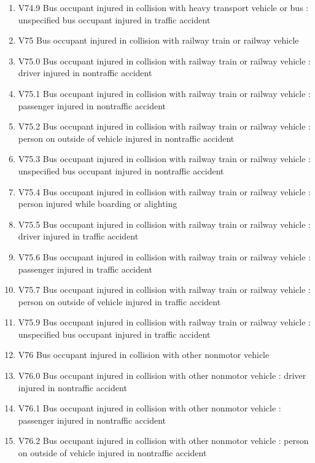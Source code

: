 \documentclass[
]{scrartcl}
\begin{document}
\begin{itemize}
\begin{enumerate}
  \item
    V74.9 Bus occupant injured in collision with heavy transport vehicle
    or bus : unspecified bus occupant injured in traffic accident
  \item
    V75 Bus occupant injured in collision with railway train or railway
    vehicle
  \item
    V75.0 Bus occupant injured in collision with railway train or
    railway vehicle : driver injured in nontraffic accident
  \item
    V75.1 Bus occupant injured in collision with railway train or
    railway vehicle : passenger injured in nontraffic accident
  \item
    V75.2 Bus occupant injured in collision with railway train or
    railway vehicle : person on outside of vehicle injured in nontraffic
    accident
  \item
    V75.3 Bus occupant injured in collision with railway train or
    railway vehicle : unspecified bus occupant injured in nontraffic
    accident
  \item
    V75.4 Bus occupant injured in collision with railway train or
    railway vehicle : person injured while boarding or alighting
  \item
    V75.5 Bus occupant injured in collision with railway train or
    railway vehicle : driver injured in traffic accident
  \item
    V75.6 Bus occupant injured in collision with railway train or
    railway vehicle : passenger injured in traffic accident
  \item
    V75.7 Bus occupant injured in collision with railway train or
    railway vehicle : person on outside of vehicle injured in traffic
    accident
  \item
    V75.9 Bus occupant injured in collision with railway train or
    railway vehicle : unspecified bus occupant injured in traffic
    accident
  \item
    V76 Bus occupant injured in collision with other nonmotor vehicle
  \item
    V76.0 Bus occupant injured in collision with other nonmotor vehicle
    : driver injured in nontraffic accident
  \item
    V76.1 Bus occupant injured in collision with other nonmotor vehicle
    : passenger injured in nontraffic accident
  \item
    V76.2 Bus occupant injured in collision with other nonmotor vehicle
    : person on outside of vehicle injured in nontraffic accident

\end{enumerate}
\end{itemize}
\end{document}
